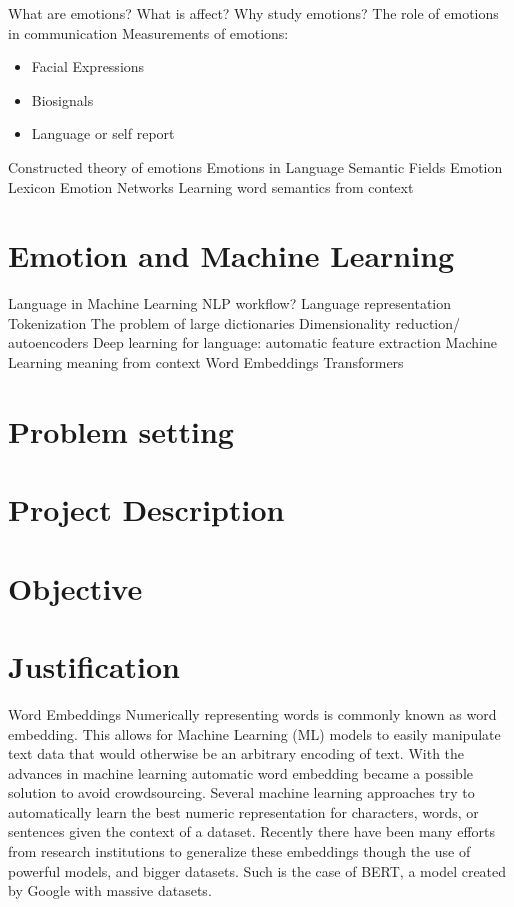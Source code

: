 What are emotions?
What is affect?
Why study emotions?
The role of emotions in communication
Measurements of emotions:
\begin{itemize}
  \item Facial Expressions
  \item Biosignals
  \item Language or self report
\end{itemize}

Constructed theory of emotions
Emotions in Language
Semantic Fields
Emotion Lexicon
Emotion Networks
Learning word semantics from context

\section{Emotion and Machine Learning}\label{sec:Emotion and Machine Learning}
Language in Machine Learning
NLP workflow?
Language representation
Tokenization
The problem of large dictionaries
Dimensionality reduction/ autoencoders
Deep learning for language: automatic feature extraction
Machine Learning meaning from context
Word Embeddings
Transformers

\section{Problem setting}\label{sec:Problem setting}


\section{Project Description}\label{sec:Project Description}


\section{Objective}\label{sec:Objective}


\section{Justification}\label{sec:Justification}

Word Embeddings
Numerically representing words is commonly known as word embedding. This allows for Machine Learning (ML) models to easily manipulate text data that would otherwise be an arbitrary encoding of text. With the advances in machine learning automatic word embedding became a possible solution to avoid crowdsourcing. %
Several machine learning approaches try to automatically learn the best numeric representation for characters, words, or sentences given the context of a dataset. Recently there have been many efforts from research institutions to generalize these embeddings though the use of powerful models, and bigger datasets. Such is the case of BERT, a model created by Google with massive datasets.

